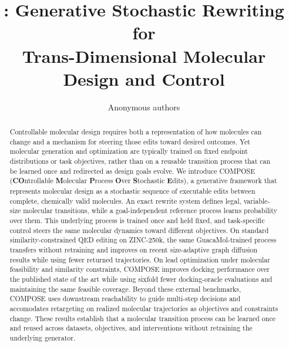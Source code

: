 \documentclass{article}
\title{\fontsize{15.9}{18.8}\selectfont \method: Generative Stochastic Rewriting for\\ Trans-Dimensional Molecular Design and Control}
\author{Anonymous authors}
\theoremstyle{definition}
\theoremstyle{remark}
\begin{document}

\maketitle

\newcommand{\TFourWins}{19}
\newcommand{\TFourLosses}{6}
\newcommand{\TFourTies}{1}
\newcommand{\TFourNoisy}{13}
\newcommand{\TFourDashWins}{3}
\newcommand{\TFourCoverage}{26}
\newcommand{\TFourNone}{4}
\newcommand{\TFourHeadWins}{16}
\newcommand{\TFourHeadN}{22}
\newcommand{\TFourPairedN}{23}
\newcommand{\TFourClusterLo}{-0.681}
\newcommand{\TFourClusterHi}{+0.014}
\newcommand{\TFourClusterN}{13}
\newcommand{\TFourMeanDiff}{-0.335}
\newcommand{\TFourCILo}{-0.651}
\newcommand{\TFourCIHi}{-0.019}

\begin{abstract}
Controllable molecular design requires both a representation of how molecules can change and a mechanism for steering those edits toward desired outcomes. Yet molecular generation and optimization are typically trained on fixed endpoint distributions or task objectives, rather than on a reusable transition process that can be learned once and redirected as design goals evolve. We introduce COMPOSE (\textbf{CO}ntrollable \textbf{M}olecular \textbf{P}rocess \textbf{O}ver \textbf{S}tochastic \textbf{E}dits), a generative framework that represents molecular design as a stochastic sequence of executable edits between complete, chemically valid molecules. An exact rewrite system defines legal, variable-size molecular transitions, while a goal-independent reference process learns probability over them. This underlying process is trained once and held fixed, and task-specific control steers the same molecular dynamics toward different objectives. On standard similarity-constrained QED editing on ZINC-250k, the same GuacaMol-trained process transfers without retraining and improves on recent size-adaptive graph diffusion results while using fewer returned trajectories. On lead optimization under molecular feasibility and similarity constraints, COMPOSE improves  docking performance over the published state of the art while using sixfold fewer docking-oracle evaluations and maintaining the same feasible coverage. Beyond these external benchmarks, COMPOSE uses downstream reachability to guide multi-step decisions and accomodates retargeting on realized molecular trajectories as objectives and constraints change. These results establish that a molecular transition process can be learned once and reused across datasets, objectives, and interventions without retraining the underlying generator.
\end{abstract}
\end{document}
